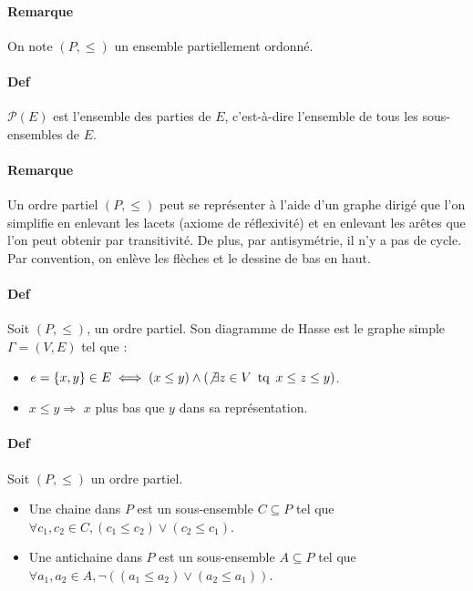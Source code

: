 \documentclass{article}
\DeclareMathOperator{\tq}{\text{ tq }}
\begin{document}
			\paragraph{Remarque} On note $(P, \leq)$ un ensemble partiellement ordonné.

			\paragraph{Def} $\mathcal P(E)$ est l'ensemble des parties de $E$, c'est-à-dire l'ensemble de tous les sous-ensembles de $E$.

			\paragraph{Remarque} Un ordre partiel $(P, \leq)$ peut se représenter à l'aide d'un graphe dirigé que l'on simplifie en enlevant les lacets
			(axiome de réflexivité) et en enlevant les arêtes que l'on peut obtenir par transitivité. De plus, par antisymétrie, il n'y a pas de
			cycle. Par convention, on enlève les flèches et le dessine de bas en haut.

			\paragraph{Def} Soit $(P, \leq)$, un ordre partiel. Son diagramme de Hasse est le graphe simple $\Gamma = (V, E)$ tel que :
				\begin{itemize}
					\item $e = \{x, y\} \in E \iff (x \leq y) \land (\not \exists z \in V \tq x \leq z \leq y)$.
					\item $x \leq y \Rightarrow$ $x$ plus bas que $y$ dans sa représentation.
				\end{itemize}

			\paragraph{Def} Soit $(P, \leq)$ un ordre partiel.
				\begin{itemize}
					\item Une chaine dans $P$ est un sous-ensemble $C \subseteq P$ tel que $\forall c_1, c_2 \in C, (c_1 \leq c_2) \lor (c_2 \leq c_1)$.
					\item Une antichaine dans $P$ est un sous-ensemble $A \subseteq P$ tel que $\forall a_1, a_2 \in A, \lnot ((a_1 \leq a_2) \lor (a_2 \leq a_1))$.
				\end{itemize}
\end{document}
